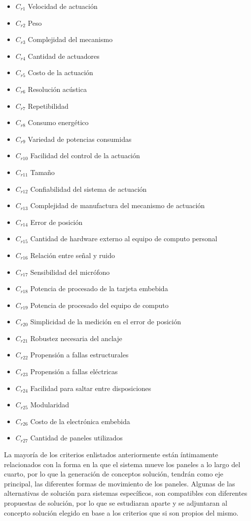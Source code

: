 \begin{itemize}
    \item $C_{r1}$ Velocidad de actuación
    \item $C_{r2}$ Peso
    \item $C_{r3}$ Complejidad del mecanismo
    \item $C_{r4}$ Cantidad de actuadores
    \item $C_{r5}$ Costo de la actuación
    \item $C_{r6}$ Resolución acústica
    \item $C_{r7}$ Repetibilidad
    \item $C_{r8}$ Consumo energético
    \item $C_{r9}$ Variedad de potencias consumidas
    \item $C_{r10}$ Facilidad del control de la actuación
    \item $C_{r11}$ Tamaño
    \item $C_{r12}$ Confiabilidad del sistema de actuación
    \item $C_{r13}$ Complejidad de manufactura del mecanismo de actuación
    \item $C_{r14}$ Error de posición 
    \item $C_{r15}$ Cantidad de hardware externo al equipo de computo personal
    \item $C_{r16}$ Relación entre señal y ruido
    \item $C_{r17}$ Sensibilidad del micrófono
    \item $C_{r18}$ Potencia de procesado de la tarjeta embebida
    \item $C_{r19}$ Potencia de procesado del equipo de computo
    \item $C_{r20}$ Simplicidad de la medición en el error de posición
    \item $C_{r21}$ Robustez necesaria del anclaje
    \item $C_{r22}$ Propensión a fallas estructurales
    \item $C_{r23}$ Propensión a fallas eléctricas
    \item $C_{r24}$ Facilidad para saltar entre disposiciones 
    \item $C_{r25}$ Modularidad
    \item $C_{r26}$ Costo de la electrónica embebida
    \item $C_{r27}$ Cantidad de paneles utilizados
\end{itemize}
La mayoría de los criterios enlistados anteriormente están íntimamente relacionados con la forma en la que el sistema mueve los paneles a lo largo del cuarto, por lo que la generación de conceptos solución, tendrán como eje principal, las diferentes formas de movimiento de los paneles.
Algunas de las alternativas de solución para sistemas específicos, son compatibles con diferentes propuestas de solución, por lo que se estudiaran aparte y se adjuntaran al concepto solución elegido en base a los criterios que si son propios del mismo.


